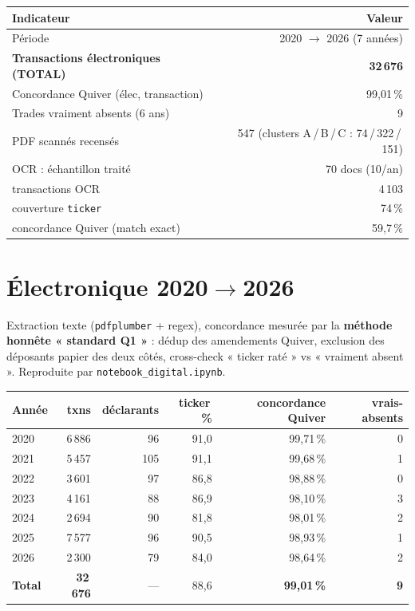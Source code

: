 \documentclass[11pt,a4paper]{article}
\newcommand{\file}[1]{\texttt{\small #1}}
\begin{document}
\begin{center}
\begin{tabular}{@{}l r@{}}
\toprule
\textbf{Indicateur} & \textbf{Valeur} \\
\midrule
Période & 2020 $\rightarrow$ 2026 (7 années) \\
\textbf{Transactions électroniques (TOTAL)} & \textbf{32\,676} \\
Concordance Quiver (élec, transaction) & 99,01\,\% \\
Trades vraiment absents (6 ans) & 9 \\
\midrule
PDF scannés recensés & 547 \quad(clusters A\,/\,B\,/\,C : 74\,/\,322\,/\,151) \\
OCR : échantillon traité & 70 docs (10/an) \\
\quad transactions OCR & 4\,103 \\
\quad couverture \texttt{ticker} & 74\,\% \\
\quad concordance Quiver (match exact) & 59,7\,\% \\
\bottomrule
\end{tabular}
\end{center}

\section{Électronique 2020$\rightarrow$2026}

Extraction texte (\texttt{pdfplumber} + regex), concordance mesurée par la
\textbf{méthode honnête « standard Q1 »} : dédup des amendements Quiver, exclusion
des déposants papier des deux côtés, cross-check « ticker raté » vs « vraiment absent ».
Reproduite par \file{notebook\_digital.ipynb}.

\begin{center}
\begin{tabular}{@{}l r r r r r@{}}
\toprule
\textbf{Année} & \textbf{txns} & \textbf{déclarants} & \textbf{ticker\,\%}
  & \textbf{concordance Quiver} & \textbf{vrais-absents} \\
\midrule
2020 & 6\,886 & 96  & 91,0 & 99,71\,\% & 0 \\
2021 & 5\,457 & 105 & 91,1 & 99,68\,\% & 1 \\
2022 & 3\,601 & 97  & 86,8 & 98,88\,\% & 0 \\
2023 & 4\,161 & 88  & 86,9 & 98,10\,\% & 3 \\
2024 & 2\,694 & 90  & 81,8 & 98,01\,\% & 2 \\
2025 & 7\,577 & 96  & 90,5 & 98,93\,\% & 1 \\
2026 & 2\,300 & 79  & 84,0 & 98,64\,\% & 2 \\
\midrule
\textbf{Total} & \textbf{32\,676} & --- & 88,6 & \textbf{99,01\,\%} & \textbf{9} \\
\bottomrule
\end{tabular}
\end{center}
\end{document}
